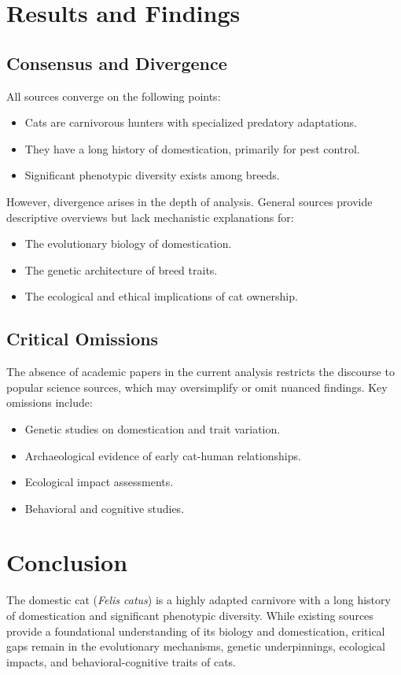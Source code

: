 \documentclass{article}
\begin{document}
\section{Results and Findings}
\subsection{Consensus and Divergence}
All sources converge on the following points:
\begin{itemize}
    \item Cats are carnivorous hunters with specialized predatory adaptations.
    \item They have a long history of domestication, primarily for pest control.
    \item Significant phenotypic diversity exists among breeds.
\end{itemize}

However, divergence arises in the depth of analysis. General sources provide descriptive overviews but lack mechanistic explanations for:
\begin{itemize}
    \item The evolutionary biology of domestication.
    \item The genetic architecture of breed traits.
    \item The ecological and ethical implications of cat ownership.
\end{itemize}

\subsection{Critical Omissions}
The absence of academic papers in the current analysis restricts the discourse to popular science sources, which may oversimplify or omit nuanced findings. Key omissions include:
\begin{itemize}
    \item Genetic studies on domestication and trait variation.
    \item Archaeological evidence of early cat-human relationships.
    \item Ecological impact assessments.
    \item Behavioral and cognitive studies.
\end{itemize}

\section{Conclusion}
The domestic cat (\textit{Felis catus}) is a highly adapted carnivore with a long history of domestication and significant phenotypic diversity. While existing sources provide a foundational understanding of its biology and domestication, critical gaps remain in the evolutionary mechanisms, genetic underpinnings, ecological impacts, and behavioral-cognitive traits of cats.
\end{document}
